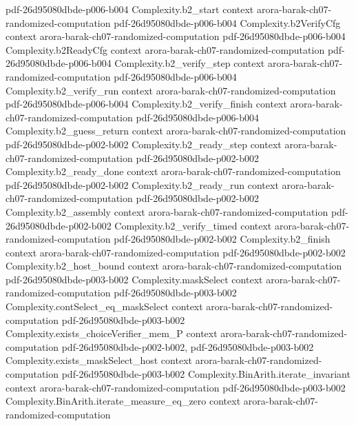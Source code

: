 \begin{theorem}
  {pdf-26d95080dbde-p006-b004}
\proofstep
  {Complexity.b2_start}
  {context}
  {arora-barak-ch07-randomized-computation}
  {pdf-26d95080dbde-p006-b004}
\proofstep
  {Complexity.b2VerifyCfg}
  {context}
  {arora-barak-ch07-randomized-computation}
  {pdf-26d95080dbde-p006-b004}
\proofstep
  {Complexity.b2ReadyCfg}
  {context}
  {arora-barak-ch07-randomized-computation}
  {pdf-26d95080dbde-p006-b004}
\proofstep
  {Complexity.b2_verify_step}
  {context}
  {arora-barak-ch07-randomized-computation}
  {pdf-26d95080dbde-p006-b004}
\proofstep
  {Complexity.b2_verify_run}
  {context}
  {arora-barak-ch07-randomized-computation}
  {pdf-26d95080dbde-p006-b004}
\proofstep
  {Complexity.b2_verify_finish}
  {context}
  {arora-barak-ch07-randomized-computation}
  {pdf-26d95080dbde-p006-b004}
\proofstep
  {Complexity.b2_guess_return}
  {context}
  {arora-barak-ch07-randomized-computation}
  {pdf-26d95080dbde-p002-b002}
\proofstep
  {Complexity.b2_ready_step}
  {context}
  {arora-barak-ch07-randomized-computation}
  {pdf-26d95080dbde-p002-b002}
\proofstep
  {Complexity.b2_ready_done}
  {context}
  {arora-barak-ch07-randomized-computation}
  {pdf-26d95080dbde-p002-b002}
\proofstep
  {Complexity.b2_ready_run}
  {context}
  {arora-barak-ch07-randomized-computation}
  {pdf-26d95080dbde-p002-b002}
\proofstep
  {Complexity.b2_assembly}
  {context}
  {arora-barak-ch07-randomized-computation}
  {pdf-26d95080dbde-p002-b002}
\proofstep
  {Complexity.b2_verify_timed}
  {context}
  {arora-barak-ch07-randomized-computation}
  {pdf-26d95080dbde-p002-b002}
\proofstep
  {Complexity.b2_finish}
  {context}
  {arora-barak-ch07-randomized-computation}
  {pdf-26d95080dbde-p002-b002}
\proofstep
  {Complexity.b2_host_bound}
  {context}
  {arora-barak-ch07-randomized-computation}
  {pdf-26d95080dbde-p003-b002}
\proofstep
  {Complexity.maskSelect}
  {context}
  {arora-barak-ch07-randomized-computation}
  {pdf-26d95080dbde-p003-b002}
\proofstep
  {Complexity.contSelect_eq_maskSelect}
  {context}
  {arora-barak-ch07-randomized-computation}
  {pdf-26d95080dbde-p003-b002}
\proofstep
  {Complexity.exists_choiceVerifier_mem_P}
  {context}
  {arora-barak-ch07-randomized-computation}
  {pdf-26d95080dbde-p002-b002,
    pdf-26d95080dbde-p003-b002}
\proofstep
  {Complexity.exists_maskSelect_host}
  {context}
  {arora-barak-ch07-randomized-computation}
  {pdf-26d95080dbde-p003-b002}
\proofstep
  {Complexity.BinArith.iterate_invariant}
  {context}
  {arora-barak-ch07-randomized-computation}
  {pdf-26d95080dbde-p003-b002}
\proofstep
  {Complexity.BinArith.iterate_measure_eq_zero}
  {context}
  {arora-barak-ch07-randomized-computation}

\end{theorem}
